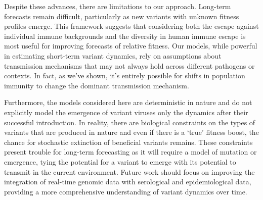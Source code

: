 \documentclass[11pt,oneside,letterpaper]{article}
\begin{document}

Despite these advances, there are limitations to our approach.
Long-term forecasts remain difficult, particularly as new variants with unknown fitness profiles emerge.
This framework suggests that considering both the escape against individual immune backgrounds and the diversity in human immune escape is most useful for improving forecasts of relative fitness.
Our models, while powerful in estimating short-term variant dynamics, rely on assumptions about transmission mechanisms that may not always hold across different pathogens or contexts.
In fact, as we've shown, it's entirely possible for shifts in population immunity to change the dominant transmission mechanism.

Furthermore, the models considered here are deterministic in nature and do not explicitly model the emergence of variant viruses only the dynamics after their successful introduction.
In reality, there are biological constraints on the types of variants that are produced in nature and even if there is a `true' fitness boost, the chance for stochastic extinction of beneficial variants remains.
These constraints present trouble for long-term forecasting as it will require a model of mutation or emergence, tying the potential for a variant to emerge with its potential to transmit in the current environment.
Future work should focus on improving the integration of real-time genomic data with serological and epidemiological data, providing a more comprehensive understanding of variant dynamics over time.


\end{document}
